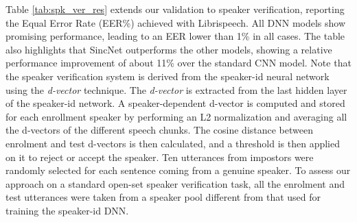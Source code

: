 \documentclass{article}
\begin{document}
 Table \ref{tab:spk_ver_res} extends our validation to speaker verification, reporting the Equal Error Rate (EER\%) achieved with Librispeech. All DNN models show promising performance, leading to an EER lower than 1\% in all cases. The table also highlights that SincNet outperforms the other models, showing a relative performance improvement of about 11\% over the standard CNN model. Note that the speaker verification system is derived from the speaker-id neural network using the \textit{d-vector} technique. The \textit{d-vector} \cite{dnn_spk_rec_class2,voxceleb} is extracted from the last hidden layer of the speaker-id network. A speaker-dependent d-vector is computed and stored for each enrollment speaker by performing an L2 normalization and averaging all the d-vectors of the different speech chunks. The cosine  distance between enrolment and test d-vectors is then calculated, and a threshold is then applied on it to reject or accept the speaker.
Ten utterances from impostors were randomly selected for each sentence coming from a genuine speaker.
To assess our approach on a standard open-set speaker verification task, all the enrolment and test utterances were taken from a speaker pool different from that used for training the speaker-id DNN.
 
\end{document}
